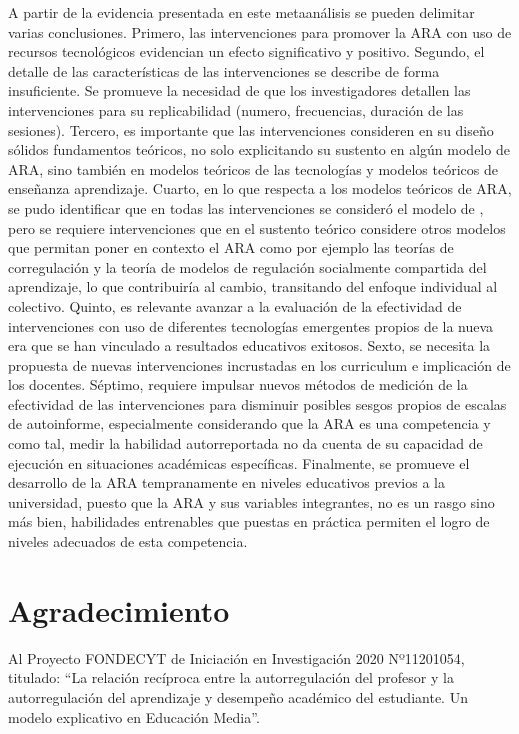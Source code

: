 \documentclass[spanish]{textolivre}
\begin{document}
A partir de la evidencia presentada en este metaanálisis se pueden delimitar varias conclusiones. Primero, las intervenciones para promover la ARA con uso de recursos tecnológicos evidencian un efecto significativo y positivo. Segundo, el detalle de las características de las intervenciones se describe de forma insuficiente. Se promueve la necesidad de que los investigadores detallen las intervenciones para su replicabilidad (numero, frecuencias, duración de las sesiones). Tercero, es importante que las intervenciones consideren en su diseño sólidos fundamentos teóricos, no solo explicitando su sustento en algún modelo de ARA, sino también en modelos teóricos de las tecnologías y modelos teóricos de enseñanza aprendizaje. Cuarto, en lo que respecta a los modelos teóricos de ARA, se pudo identificar que en todas las intervenciones se consideró el modelo de \textcite{zimmerman2000attaining}, pero se requiere intervenciones que en el sustento teórico considere otros modelos que permitan poner en contexto el ARA como por ejemplo las teorías de corregulación y la teoría de modelos de regulación socialmente compartida del aprendizaje, lo que contribuiría al cambio, transitando del enfoque individual al colectivo. Quinto, es relevante avanzar a la evaluación de la efectividad de intervenciones con uso de diferentes tecnologías emergentes propios de la nueva era que se han vinculado a resultados educativos exitosos. Sexto, se necesita la propuesta de nuevas intervenciones incrustadas en los curriculum e implicación de los docentes. Séptimo, requiere impulsar nuevos métodos de medición de la efectividad de las intervenciones para disminuir posibles sesgos propios de escalas de autoinforme, especialmente considerando que la ARA es una competencia y como tal, medir la habilidad autorreportada no da cuenta de su capacidad de ejecución en situaciones académicas específicas. Finalmente, se promueve el desarrollo de la ARA tempranamente en niveles educativos previos a la universidad, puesto que la ARA y sus variables integrantes, no es un rasgo sino más bien, habilidades entrenables que puestas en práctica permiten el logro de niveles adecuados de esta competencia. 

\section{Agradecimiento}
Al Proyecto FONDECYT de Iniciación en Investigación 2020 Nº11201054, titulado: “La relación recíproca entre la autorregulación del profesor y la autorregulación del aprendizaje y desempeño académico del estudiante. Un modelo explicativo en Educación Media”.
\end{document}
